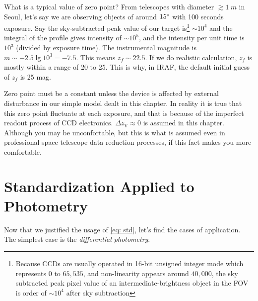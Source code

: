 
What is a typical value of zero point? From telescopes with diameter $ \gtrsim \SI{1}{m} $ in Seoul, let's say we are observing objects of around $ \m{15} $ with 100 seconds exposure. Say the sky-subtracted peak value of our target is\footnote{Because CCDs are usually operated in 16-bit unsigned integer mode which represents $ 0 $ to $ 65,535 $, and non-linearity appears around $ 40,000 $, the sky subtracted peak pixel value of an intermediate-brightness object in the FOV is order of $ \sim 10^4 $ after sky subtraction} $ \sim 10^4 $ and the integral of the profile gives intensity of $ \sim 10^{5} $, and the intensity per unit time is $ 10^3 $ (divided by exposure time). The instrumental magnitude is $ m \sim -2.5 \lg 10^3 = -7.5 $. This means $ z_f \sim 22.5 $. If we do realistic calculation, $ z_f $ is mostly within a range of 20 to 25. This is why, in IRAF, the default initial guess of $ z_f $ is 25 mag.

Zero point must be a constant unless the device is affected by external disturbance in our simple model dealt in this chapter. In reality it is true that this zero point fluctuate at each exposure, and that is because of the imperfect readout process of CCD electronics. $ \Delta z_\mathrm{V} \approx 0 $ is assumed in this chapter. Although you may be unconfortable, but this is what is assumed even in professional space telescope data reduction processes, if this fact makes you more comfortable.

\section{Standardization Applied to Photometry}
Now that we justified the usage of \cref{eq: std}, let's find the cases of application. The simplest case is the \textit{differential photometry}. 

